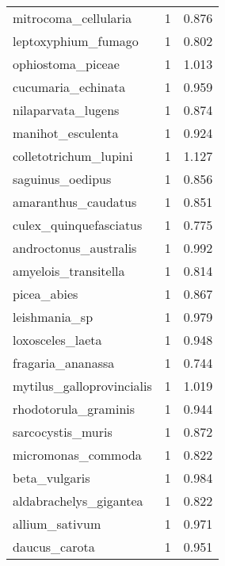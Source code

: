 \begin{tabular}{lrr}
           mitrocoma\_cellularia &                   1 &     0.876 \\
            leptoxyphium\_fumago &                   1 &     0.802 \\
              ophiostoma\_piceae &                   1 &     1.013 \\
             cucumaria\_echinata &                   1 &     0.959 \\
             nilaparvata\_lugens &                   1 &     0.874 \\
              manihot\_esculenta &                   1 &     0.924 \\
          colletotrichum\_lupini &                   1 &     1.127 \\
               saguinus\_oedipus &                   1 &     0.856 \\
            amaranthus\_caudatus &                   1 &     0.851 \\
         culex\_quinquefasciatus &                   1 &     0.775 \\
          androctonus\_australis &                   1 &     0.992 \\
           amyelois\_transitella &                   1 &     0.814 \\
                    picea\_abies &                   1 &     0.867 \\
                  leishmania\_sp &                   1 &     0.979 \\
               loxosceles\_laeta &                   1 &     0.948 \\
              fragaria\_ananassa &                   1 &     0.744 \\
      mytilus\_galloprovincialis &                   1 &     1.019 \\
           rhodotorula\_graminis &                   1 &     0.944 \\
              sarcocystis\_muris &                   1 &     0.872 \\
             micromonas\_commoda &                   1 &     0.822 \\
                  beta\_vulgaris &                   1 &     0.984 \\
         aldabrachelys\_gigantea &                   1 &     0.822 \\
                 allium\_sativum &                   1 &     0.971 \\
                  daucus\_carota &                   1 &     0.951 \\

\end{tabular}
